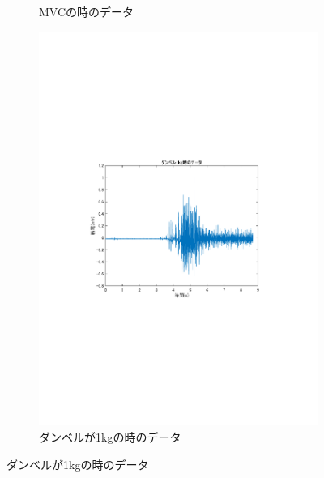 \documentclass[dvipdfmx, titlepage, t]{jsarticle}
\begin{document}
\begin{figure}[H]
\begin{subfigure}[b]{0.48\linewidth}
        \caption{MVCの時のデータ} %
        \label{fig:suba}
    \end{subfigure}
    \hfill %
    \begin{subfigure}[b]{0.48\linewidth}
        \centering
        \includegraphics[trim=90 250 100 250 clip,width=\linewidth]{figure/data_1kg.pdf}
        \caption{ダンベルが1kgの時のデータ} %
        \label{fig:subb}
    \end{subfigure}

    \vspace{1em} %


\end{figure}
\end{document}
